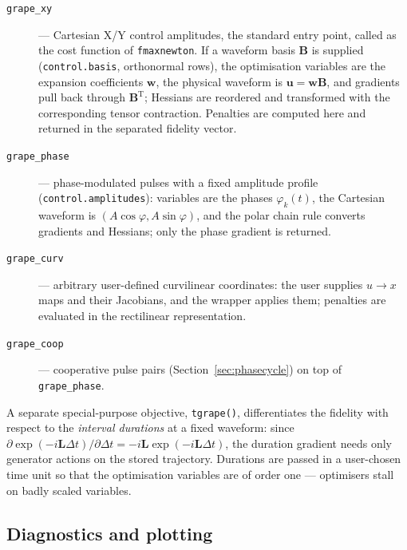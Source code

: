 \documentclass[11pt,a4paper]{article}
\newcommand{\code}[1]{\texttt{#1}}
\begin{document}
\begin{description}
\item[\code{grape\_xy}] --- Cartesian X/Y control amplitudes, the
  standard entry point, called as the cost function of
  \code{fmaxnewton}. If a waveform basis $\mathbf{B}$ is supplied
  (\code{control.basis}, orthonormal rows), the optimisation variables
  are the expansion coefficients $\mathbf{w}$, the physical waveform is
  $\mathbf{u}=\mathbf{w}\mathbf{B}$, and gradients pull back through
  $\mathbf{B}^{\mathrm{T}}$; Hessians are reordered and transformed with
  the corresponding tensor contraction. Penalties are computed here and
  returned in the separated fidelity vector.
\item[\code{grape\_phase}] --- phase-modulated pulses with a fixed
  amplitude profile (\code{control.amplitudes}): variables are the
  phases $\varphi_k(t)$, the Cartesian waveform is
  $(A\cos\varphi,A\sin\varphi)$, and the polar chain rule converts
  gradients and Hessians; only the phase gradient is returned.
\item[\code{grape\_curv}] --- arbitrary user-defined curvilinear
  coordinates: the user supplies $u\!\to\!x$ maps and their Jacobians,
  and the wrapper applies them; penalties are evaluated in the
  rectilinear representation.
\item[\code{grape\_coop}] --- cooperative pulse pairs
  (Section~\ref{sec:phasecycle}) on top of \code{grape\_phase}.
\end{description}

A separate special-purpose objective, \code{tgrape()}, differentiates the
fidelity with respect to the \emph{interval durations} at a fixed
waveform: since
$\partial\exp(-i\mathbf{L}\Delta t)/\partial\Delta t
=-i\mathbf{L}\exp(-i\mathbf{L}\Delta t)$, the duration gradient needs
only generator actions on the stored trajectory. Durations are passed in
a user-chosen time unit so that the optimisation variables are of order
one --- optimisers stall on badly scaled variables.

\subsection{Diagnostics and plotting}
\label{sec:plotting}
\end{document}
